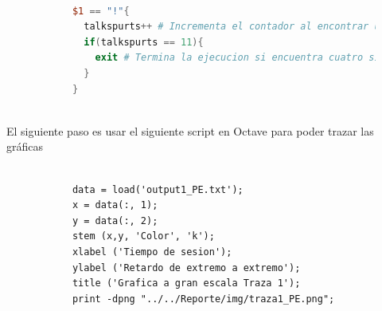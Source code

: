 \begin{enumerate}
\begin{figure}[H]
\begin{lstlisting}[frame=single, breaklines=true, basicstyle=\footnotesize\ttfamily, breakatwhitespace=false, 
      columns=flexible, tabsize=2, showstringspaces=false, language=AWK]
      
      $1 == "!"{
        talkspurts++ # Incrementa el contador al encontrar un espacio de silencio
        if(talkspurts == 11){
          exit # Termina la ejecucion si encuentra cuatro signos "!"
        }
      }
      
    \end{lstlisting}
  \end{figure}

  \noindent El siguiente paso es usar el siguiente script en Octave para poder trazar las gr\'aficas
  \begin{figure}[H]
    \centering
    \begin{lstlisting}[frame=single, breaklines=true, basicstyle=\footnotesize\ttfamily, breakatwhitespace=false, 
      columns=flexible, tabsize=2, showstringspaces=false]

      data = load('output1_PE.txt');
      x = data(:, 1);
      y = data(:, 2);
      stem (x,y, 'Color', 'k');
      xlabel ('Tiempo de sesion');
      ylabel ('Retardo de extremo a extremo');
      title ('Grafica a gran escala Traza 1');
      print -dpng "../../Reporte/img/traza1_PE.png";

    \end{lstlisting}
  \end{figure}


\end{enumerate}
